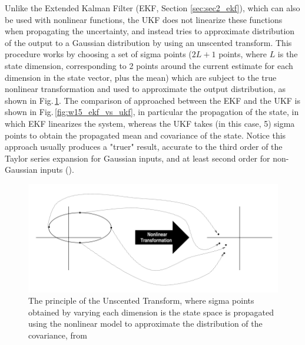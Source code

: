 \documentclass[10pt,twocolumn]{IEEEtran}
\begin{document}
Unlike the Extended Kalman Filter (EKF, Section \ref{sec:sec2_ekf}), which can also be used with nonlinear functions, the UKF does not linearize these functions when propagating the uncertainty, and instead tries to approximate distribution of the output to a Gaussian distribution by using an unscented transform. This procedure works by choosing a set of sigma points ($2L+1$ points, where $L$ is the state dimension, corresponding to 2 points around the current estimate for each dimension in the state vector, plus the mean) which are subject to the true nonlinear transformation and used to approximate the output distribution, as shown in Fig.\,\ref{fig:sec2_unscent}. The comparison of approached between the EKF and the UKF is shown in Fig.\,\ref{fig:w15_ekf_vs_ukf}, in particular the propagation of the state, in which EKF linearizes the system, whereas the UKF takes (in this case, 5) sigma points to obtain the propagated mean and covariance of the state. Notice this approach usually produces a "truer" result, accurate to the third order of the Taylor series expansion for Gaussian inputs, and at least second order for non-Gaussian inputs (\cite{asl2019adaptive}).

\begin{figure}[ht]
    \centering
    \includegraphics[width = 1\linewidth]{unscent.png}
    \caption[The principle of the Unscented Transform]{The principle of the Unscented Transform, where sigma points obtained by varying each dimension is the state space is propagated using the nonlinear model to approximate the distribution of the covariance, from \cite{julier1997new}}
    \label{fig:sec2_unscent}
\end{figure}
\end{document}
